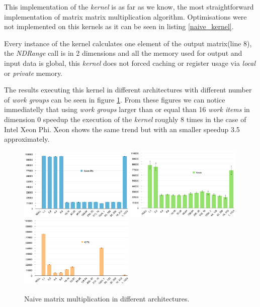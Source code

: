 \par{This implementation of the \emph{kernel} is as far as we know, the most straightforward implementation of 
    matrix matrix multiplication algorithm. Optimisations were not implemented on this kernels as it can be seen in 
    listing \ref{naive_kernel}.} 
    
\par{Every instance of the kernel calculates one element of the output matrix(line 8), 
    the \emph{NDRange} call is in 2 dimensions and all the memory used for output and input data is global, this \emph{kernel}
    does not forced caching or register usage via \emph{local} or \emph{private} memory.}

\par{The results executing this kernel in different architectures with different number of \emph{work groups } can be seen 
in figure \ref{Naive}. From these figures we can notice immediatelly that using \emph{work groups} larger than or equal than 16
\emph{work items} in dimension 0 speedup the execution of the \emph{kernel} roughly 8 times in the case of Intel Xeon Phi.
Xeon shows the same trend but with an smaller speedup 3.5 approximately.}

\begin{figure}[!h]
    \centering
    \includegraphics[width=0.49\textwidth]{figures/naive_phi.png}
    \includegraphics[width=0.49\textwidth]{figures/naive_cpu.png}
    \includegraphics[width=0.49\textwidth]{figures/naive_gpu.png}
    \caption{Naive matrix multiplication in different architectures.}
    \label{Naive}
\end{figure}

